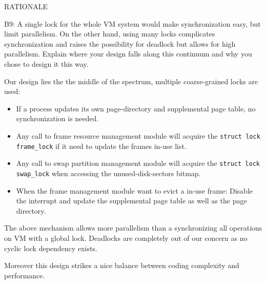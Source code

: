 \begin{aspect}{RATIONALE}
	\begin{qc}
		B9: A single lock for the whole VM system would make synchronization easy, but limit parallelism.
		On the other hand, using many locks complicates synchronization and raises the
		possibility for deadlock but allows for high parallelism.
		Explain where your design falls along this continuum and why you chose to design it this way.
	\end{qc}
	Our design lies the the middle of the spectrum, multiple coarse-grained locks are used:
	\begin{itemize}
		\item If a process updates its own page-directory and supplemental page table, no synchronization is needed.
		\item Any call to frame resource management module will acquire the \lstinline{struct lock frame_lock} if it need to update the frames in-use list.
		\item Any call to swap partition management module will acquire the \lstinline{struct lock swap_lock} when accessing the unused-disk-sectors bitmap.
		\item When the frame management module want to evict a in-use frame:
		      Disable the interrupt and update the supplemental page table as well as the page directory.
	\end{itemize}
	The above mechanism allows more parallelism than a synchronizing all operations on VM with a global lock.
	Deadlocks are completely out of our concern as no cyclic lock dependency exists.

	Moreover this design strikes a nice balance between coding complexity and performance.
\end{aspect}
